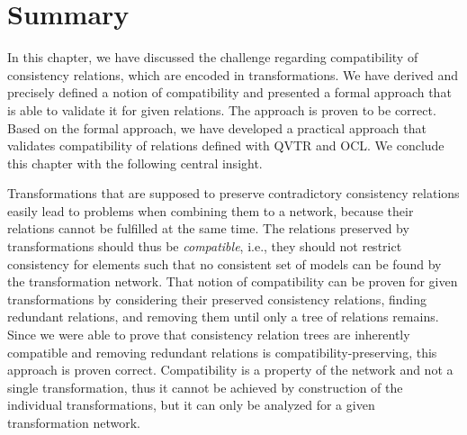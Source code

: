 \section{Summary}

In this chapter, we have discussed the challenge regarding compatibility of consistency relations, which are encoded in transformations.
We have derived and precisely defined a notion of compatibility and presented a formal approach that is able to validate it for given relations.
The approach is proven to be correct.
Based on the formal approach, we have developed a practical approach that validates compatibility of relations defined with \gls{QVTR} and \gls{OCL}.
We conclude this chapter with the following central insight.

\begin{insight}[Compatibility]
    Transformations that are supposed to preserve contradictory consistency relations easily lead to problems when combining them to a network, because their relations cannot be fulfilled at the same time.
    The relations preserved by transformations should thus be \emph{compatible}, i.e., they should not restrict consistency for elements such that no consistent set of models can be found by the transformation network.
    That notion of compatibility can be proven for given transformations by considering their preserved consistency relations, finding redundant relations, and removing them until only a tree of relations remains. Since we were able to prove that consistency relation trees are inherently compatible and removing redundant relations is compatibility-preserving, this approach is proven correct.
    Compatibility is a property of the network and not a single transformation, thus it cannot be achieved by construction of the individual transformations, but it can only be analyzed for a given transformation network.
\end{insight}
